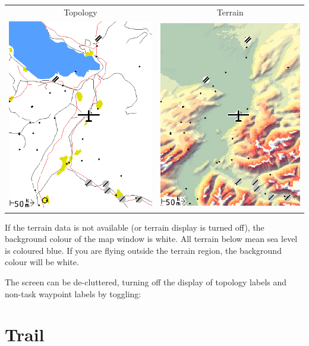 \documentclass[a4paper,12pt]{refrep}
\begin{document}
\begin{center}
\begin{tabular}{c c}
Topology & Terrain \\
\includegraphics[angle=0,width=0.4\linewidth,keepaspectratio='true']{figures/cut-topo.png} &
\includegraphics[angle=0,width=0.4\linewidth,keepaspectratio='true']{figures/cut-terrain.png} \\
\end{tabular}

\end{center}

If the terrain data is not available (or terrain display is turned
off), the background colour of the map window is white.  All terrain
below mean sea level is coloured blue.  If you are flying outside the
terrain region, the background colour will be white.

The screen can be de-cluttered, turning off the display of topology
labels and non-task waypoint labels by toggling:
\begin{quote}
\blink{}\blink{}
\end{quote}


\section{Trail}\label{sec:trail}
\end{document}
